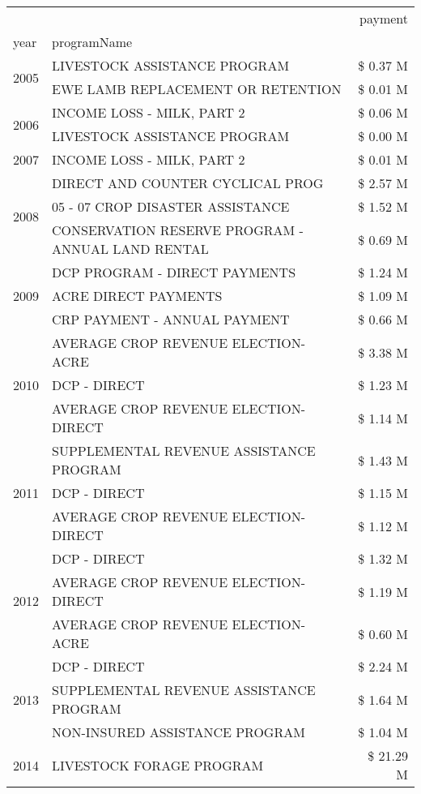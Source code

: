 \begin{tabular}{llr}
\toprule
 &  & payment \\
year & programName &  \\
\midrule
\multirow[t]{2}{*}{2005} & LIVESTOCK ASSISTANCE PROGRAM & \$ 0.37 M \\
 & EWE LAMB REPLACEMENT OR RETENTION & \$ 0.01 M \\
\cline{1-3}
\multirow[t]{2}{*}{2006} & INCOME LOSS - MILK, PART 2 & \$ 0.06 M \\
 & LIVESTOCK ASSISTANCE PROGRAM & \$ 0.00 M \\
\cline{1-3}
2007 & INCOME LOSS - MILK, PART 2 & \$ 0.01 M \\
\cline{1-3}
\multirow[t]{3}{*}{2008} & DIRECT AND COUNTER CYCLICAL PROG & \$ 2.57 M \\
 & 05 - 07 CROP DISASTER ASSISTANCE & \$ 1.52 M \\
 & CONSERVATION RESERVE PROGRAM - ANNUAL LAND RENTAL & \$ 0.69 M \\
\cline{1-3}
\multirow[t]{3}{*}{2009} & DCP PROGRAM - DIRECT PAYMENTS & \$ 1.24 M \\
 & ACRE DIRECT PAYMENTS & \$ 1.09 M \\
 & CRP PAYMENT - ANNUAL PAYMENT & \$ 0.66 M \\
\cline{1-3}
\multirow[t]{3}{*}{2010} & AVERAGE CROP REVENUE ELECTION-ACRE & \$ 3.38 M \\
 & DCP - DIRECT & \$ 1.23 M \\
 & AVERAGE CROP REVENUE ELECTION-DIRECT & \$ 1.14 M \\
\cline{1-3}
\multirow[t]{3}{*}{2011} & SUPPLEMENTAL REVENUE ASSISTANCE PROGRAM & \$ 1.43 M \\
 & DCP - DIRECT & \$ 1.15 M \\
 & AVERAGE CROP REVENUE ELECTION-DIRECT & \$ 1.12 M \\
\cline{1-3}
\multirow[t]{3}{*}{2012} & DCP - DIRECT & \$ 1.32 M \\
 & AVERAGE CROP REVENUE ELECTION-DIRECT & \$ 1.19 M \\
 & AVERAGE CROP REVENUE ELECTION-ACRE & \$ 0.60 M \\
\cline{1-3}
\multirow[t]{3}{*}{2013} & DCP - DIRECT & \$ 2.24 M \\
 & SUPPLEMENTAL REVENUE ASSISTANCE PROGRAM & \$ 1.64 M \\
 & NON-INSURED ASSISTANCE PROGRAM & \$ 1.04 M \\
\cline{1-3}
\multirow[t]{3}{*}{2014} & LIVESTOCK FORAGE PROGRAM & \$ 21.29 M \\

\end{tabular}
